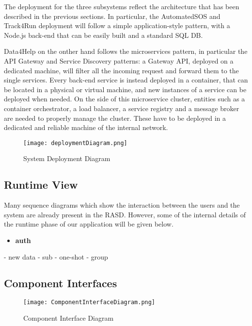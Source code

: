The deployment for the three subsystems reflect the architecture that has been described in the previous sections. In particular, the AutomatedSOS and Track4Run deployment will follow a simple application-style pattern, with a Node.js back-end that can be easily built and a standard SQL DB.

Data4Help on the onther hand follows the microservices pattern, in particular the API Gateway and Service Discovery patterns: a Gateway API, deployed on a dedicated machine, will filter all the incoming request and forward them to the single services. Every back-end service is instead deployed in a container, that can be located in a physical or virtual machine, and new instances of a service can be deployed when needed. On the side of this microservice cluster, entities such as a container orchestrator, a load balancer, a service registry and a message broker are needed to properly manage the cluster. These have to be deployed in a dedicated and reliable machine of the internal network.

\FloatBarrier
\begin{figure}[!h]
	\centering
	\texttt{[image: deploymentDiagram.png]}
	\caption{System Deployment Diagram}
\end{figure}
\FloatBarrier

\subsection{Runtime View}
Many sequence diagrams which show the interaction between the users and the system are already present in the RASD. However, some of the internal details of the runtime phase of our application will be given below.

\begin{itemize}
	\item \textbf{auth}
\end{itemize}
	
- new data
- sub
- one-shot
- group

\subsection{Component Interfaces}

\FloatBarrier
\begin{figure}[!h]
	\centering
	\texttt{[image: ComponentInterfaceDiagram.png]}
	\caption{Component Interface Diagram}
\end{figure}
\FloatBarrier

